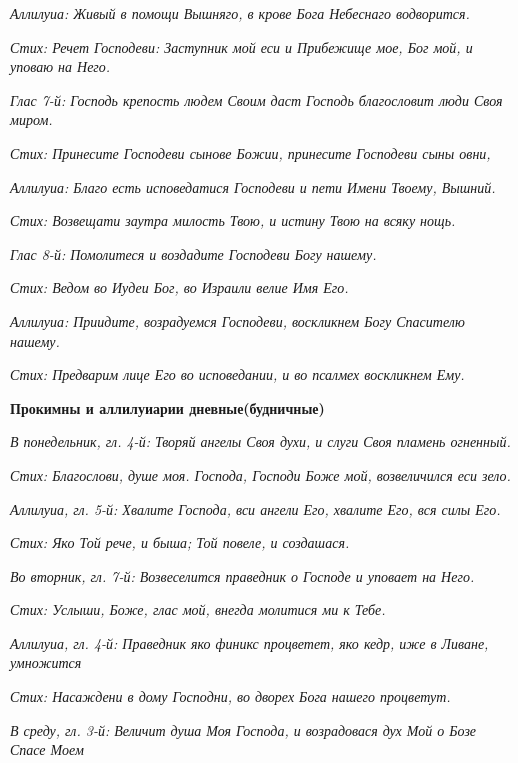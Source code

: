 \itshape Аллилуиа:\normalfont{} Живый в помощи Вышняго, в крове Бога Небеснаго водворится.


\itshape Стих:\normalfont{} Речет Господеви: Заступник мой еси и Прибежище мое, Бог мой, и уповаю на Него.


\itshape Глас 7-й:\normalfont{} Господь крепость людем Своим даст Господь благословит люди Своя миром.


\itshape Стих:\normalfont{} Принесите Господеви сынове Божии, принесите Господеви сыны овни,


\itshape Аллилуиа:\normalfont{} Благо есть исповедатися Господеви и пети Имени Твоему, Вышний.


\itshape Стих:\normalfont{} Возвещати заутра милость Твою, и истину Твою на всяку нощь.


\itshape Глас 8-й:\normalfont{} Помолитеся и воздадите Господеви Богу нашему.


\itshape Стих:\normalfont{} Ведом во Иудеи Бог, во Израили велие Имя Его.


\itshape Аллилуиа:\normalfont{} Приидите, возрадуемся Господеви, воскликнем Богу Спасителю нашему.


\itshape Стих:\normalfont{} Предварим лице Его во исповедании, и во псалмех воскликнем Ему.




\medskip\bfseries Прокимны и аллилуиарии дневные(будничные)\normalfont{}\nopagebreak


\itshape В понедельник, гл. 4-й:\normalfont{} Творяй ангелы Своя духи, и слуги Своя пламень огненный.


\itshape Стих:\normalfont{} Благослови, душе моя. Господа, Господи Боже мой, возвеличился еси зело.


\itshape Аллилуиа, гл. 5-й:\normalfont{} Хвалите Господа, вси ангели Его, хвалите Его, вся силы Его.


\itshape Стих:\normalfont{} Яко Той рече, и быша; Той повеле, и создашася.


\itshape Во вторник, гл. 7-й:\normalfont{} Возвеселится праведник о Господе и уповает на Него.


\itshape Стих:\normalfont{} Услыши, Боже, глас мой, внегда молитися ми к Тебе.


\itshape Аллилуиа, гл. 4-й:\normalfont{} Праведник яко финикс процветет, яко кедр, иже в Ливане, умножится


\itshape Стих:\normalfont{} Насаждени в дому Господни, во дворех Бога нашего процветут.


\itshape В сред\normalfont{}у\itshape , гл. 3-й:\normalfont{} Величит душа Моя Господа, и возрадовася дух Мой о Бозе Спасе Моем



